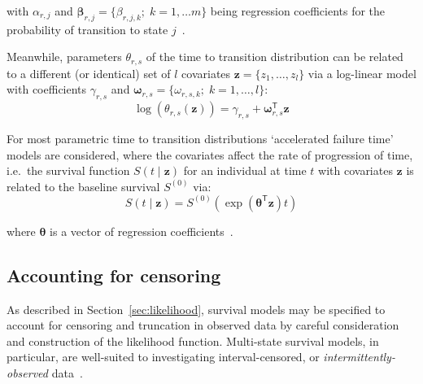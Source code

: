 with $\alpha_{r,j}$ and $\bm{\beta}_{r,j} = \{\beta_{r,j,k};\; k = 1, \ldots m\}$ being regression coefficients for the probability of transition to state $j$~\parencite{Fagerland2008-nb}.

Meanwhile, parameters $\theta_{r,s}$ of the time to transition distribution can be related to a different (or identical) set of $l$ covariates $\bm{z} = \{z_1, \ldots, z_l\}$ via a log-linear model with coefficients $\gamma_{r,s}$ and $\bm{\omega}_{r,s} = \{\omega_{r,s,k};\; k = 1, \ldots, l\}$:
%
\[
    \log(\theta_{r,s}(\bm{z}))=\gamma_{r,s} + \bm{\omega}_{r,s}^\mathsf{T} \bm{z}
\]

For most parametric time to transition distributions `accelerated failure time' models are considered, where the covariates affect the rate of progression of time, i.e.\ the survival function $S(t \mid \bm{z})$ for an individual at time $t$ with covariates $\bm{z}$ is related to the baseline survival $S^{(0)}$ via:
%
\[
    S(t\mid \bm{z}) = S^{(0)}\left(\exp(\bm{\theta}^\mathsf{T}\bm{z})t\right)
\]

where $\bm{\theta}$ is a vector of regression coefficients~\parencite{Klein2005-ls}.




\subsection{Accounting for censoring}\label{sec:censoring-intermittent}

As described in Section~\ref{sec:likelihood}, survival models may be specified to account for censoring and truncation in observed data by careful consideration and construction of the likelihood function. Multi-state survival models, in particular, are well-suited to investigating interval-censored, or \textit{intermittently-observed} data~\parencite{van-den-Hout2016-xy}.


